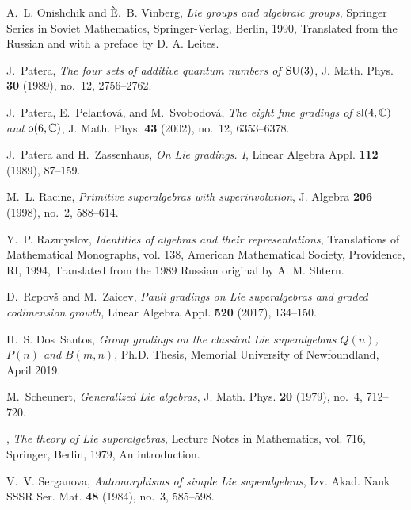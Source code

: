 \documentclass[12pt]{pdfathesis}
\begin{document}
\begin{thebibliography}{BHDSK17}
A.~L. Onishchik and \`E.~B. Vinberg, \emph{Lie groups and algebraic groups},
  Springer Series in Soviet Mathematics, Springer-Verlag, Berlin, 1990,
  Translated from the Russian and with a preface by D. A. Leites. 

J.~Patera, \emph{The four sets of additive quantum numbers of {${\rm SU}(3)$}},
  J. Math. Phys. \textbf{30} (1989), no.~12, 2756--2762. 

J.~Patera, E.~Pelantov\'{a}, and M.~Svobodov\'{a}, \emph{The eight fine
  gradings of {${\rm sl}(4,\mathbb C)$} and {${\rm o}(6,\mathbb C)$}}, J. Math.
  Phys. \textbf{43} (2002), no.~12, 6353--6378. 

J.~Patera and H.~Zassenhaus, \emph{On {L}ie gradings. {I}}, Linear Algebra
  Appl. \textbf{112} (1989), 87--159. 

M.~L. Racine, \emph{Primitive superalgebras with superinvolution}, J. Algebra
  \textbf{206} (1998), no.~2, 588--614. 

Y.~P. Razmyslov, \emph{Identities of algebras and their representations},
  Translations of Mathematical Monographs, vol. 138, American Mathematical
  Society, Providence, RI, 1994, Translated from the 1989 Russian original by
  A. M. Shtern. 

D.~Repov\v{s} and M.~Zaicev, \emph{Pauli gradings on {L}ie superalgebras and
  graded codimension growth}, Linear Algebra Appl. \textbf{520} (2017),
  134--150. 
  
H.~S. Dos~Santos, \emph{Group gradings on the classical {L}ie superalgebras
  {$Q(n)$}, {$P(n)$} and {$B(m,n)$}}, Ph.D. Thesis, Memorial University of
  Newfoundland, April 2019.

M.~Scheunert, \emph{Generalized {L}ie algebras}, J. Math. Phys. \textbf{20}
  (1979), no.~4, 712--720. 

\bysame, \emph{The theory of {L}ie superalgebras}, Lecture Notes in
  Mathematics, vol. 716, Springer, Berlin, 1979, An introduction. 

V.~V. Serganova, \emph{Automorphisms of simple {L}ie superalgebras}, Izv. Akad.
  Nauk SSSR Ser. Mat. \textbf{48} (1984), no.~3, 585--598. 


\end{thebibliography}
\end{document}
